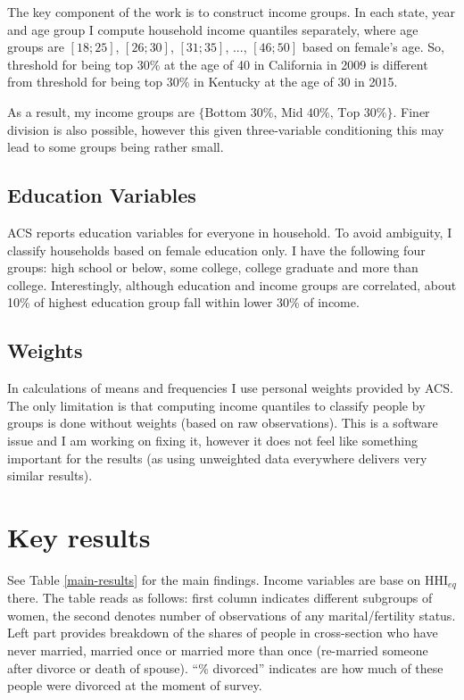 \documentclass[12pt,letter]{article}
\begin{document}
The key component of the work is to construct income groups. In each state, year and age group I compute household income quantiles separately, where age groups are $[18;25]$, $[26;30]$, $[31;35]$, ..., $[46;50]$ based on female's age. So, threshold for being top 30\% at the age of 40 in California in 2009 is different from threshold for being top 30\% in Kentucky at the age of 30 in 2015.

As a result, my income groups are $\{\text{Bottom 30\%},\,\text{Mid 40\%},\,\text{Top 30\%}\}$. Finer division is also possible, however this given three-variable conditioning this may lead to some groups being rather small.

\subsection{Education Variables}
ACS reports education variables for everyone in household. To avoid ambiguity, I classify households based on female education only. I have the following four groups: high school or below, some college, college graduate and more than college. Interestingly, although education and income groups are correlated, about 10\% of highest education group fall within lower 30\% of income.

\subsection{Weights}
In calculations of means and frequencies I use personal weights provided by ACS. The only limitation is that computing income quantiles to classify people by groups is done without weights (based on raw observations). This is a software issue and I am working on fixing it, however it does not feel like something important for the results (as using unweighted data everywhere delivers very similar results).

\section{Key results}
See Table \ref{main-results} for the main findings. Income variables are base on $\text{HHI}_{eq}$ there. The table reads as follows: first column indicates different subgroups of women, the second denotes number of observations of any marital/fertility status. Left part provides breakdown of the shares of people in cross-section who have never married, married once or married more than once (re-married someone after divorce or death of spouse). ``\% divorced'' indicates are how much of these people were divorced at the moment of survey. 
\end{document}
